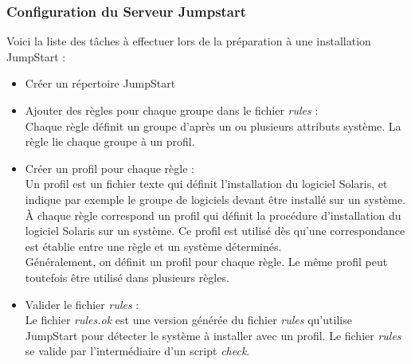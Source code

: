 \documentclass[a4paper,12pt,one side,titlepage]{report}
\begin{document}
\subsubsection{Configuration du Serveur Jumpstart}
Voici la liste des tâches à effectuer lors de la préparation à une installation JumpStart :\\
\begin{itemize}
  \item Créer un répertoire JumpStart\\
  \item Ajouter des règles pour chaque groupe dans le fichier \textit{rules} :\\
Chaque règle définit un groupe d'après un ou plusieurs attributs système. La règle lie chaque groupe à un profil.\\
  \item Créer un profil pour chaque règle :\\
Un profil est un fichier texte qui définit l'installation du logiciel Solaris, et indique par exemple le groupe de logiciels devant être installé sur un système. À chaque règle correspond un profil qui définit la procédure d'installation du logiciel Solaris sur un système. Ce profil est utilisé dès qu'une correspondance est établie entre une règle et un système déterminés.\\Généralement, on définit un profil pour chaque règle. Le même profil peut toutefois être utilisé dans plusieurs règles.\\
  \item Valider le fichier \textit{rules} :\\
Le fichier \textit{rules.ok} est une version générée du fichier \textit{rules} qu'utilise JumpStart pour détecter le système à installer avec un profil. Le fichier \textit{rules} se valide par l'intermédiaire d'un script \textit{check}.
\end{itemize}
\end{document}
